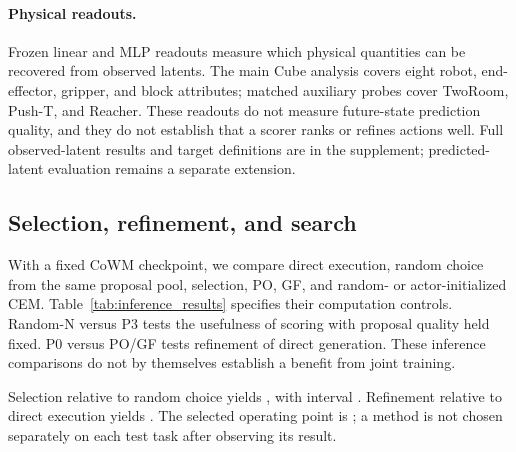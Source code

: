 \paragraph{Physical readouts.}
Frozen linear and MLP readouts measure which physical quantities can be recovered from observed latents. The main Cube analysis covers eight robot, end-effector, gripper, and block attributes; matched auxiliary probes cover TwoRoom, Push-T, and Reacher. These readouts do not measure future-state prediction quality, and they do not establish that a scorer ranks or refines actions well. Full observed-latent results and target definitions are in the supplement; predicted-latent evaluation remains a separate extension.

\subsection{Selection, refinement, and search}
\label{sec:inference_results}
With a fixed CoWM checkpoint, we compare direct execution, random choice from the same proposal pool, selection, PO, GF, and random- or actor-initialized CEM. Table~\ref{tab:inference_results} specifies their computation controls. Random-N versus P3 tests the usefulness of scoring with proposal quality held fixed. P0 versus PO/GF tests refinement of direct generation. These inference comparisons do not by themselves establish a benefit from joint training.
\begin{table}[t]
\centering\scriptsize
\resizebox{\columnwidth}{!}{}
\caption{Fixed-checkpoint inference interfaces, repeated per task. $N$ is pool size or candidates per CEM round, $S$ is generation steps, $I$ is CEM rounds, and $K$ is total refinement updates. Numeric configurations are reported with each result.}
\label{tab:inference_results}
\end{table}
Selection relative to random choice yields , with interval . Refinement relative to direct execution yields . The selected operating point is ; a method is not chosen separately on each test task after observing its result.

